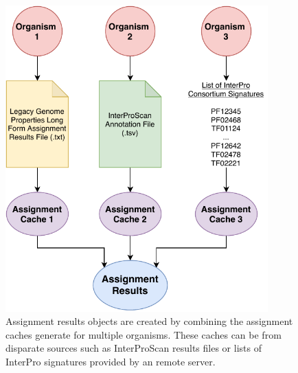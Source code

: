\begin{figure}[!ht]
     \centering
	\includegraphics[width=0.90\textwidth]{media/assignment_results_overview.pdf}
	 \caption{Assignment results objects are created by combining the assignment caches generate for multiple organisms. These caches can be from disparate sources such as InterProScan results files or lists of InterPro signatures provided by an remote server.}
	  \label{fig:resultscreation}
\end{figure}


